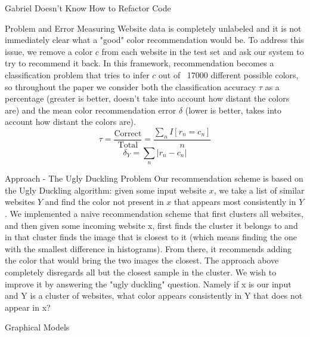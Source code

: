 \documentclass[7pt]{beamer}
\newcommand{\N}{\mathcal{N}}
\begin{document}
\begin{frame}{\centerline{\Huge Gabriel Doesn't Know How to Refactor Code}}
\begin{textblock}{5}
\begin{block}{Problem and Error Measuring}
Website data is completely unlabeled and it is not immediately clear what a "good" color recommendation would be. To address this issue, we remove a color $c$ from each website in the test set and ask our system to try to recommend it back. In this framework, recommendation becomes a classification problem that tries to infer $c$ out of ~17000 different possible colors, so throughout the paper we consider both the classification accuracy $\tau$ as a percentage (greater is better, doesn't take into account how distant the colors are) and the mean color recommendation error $\delta$ (lower is better, takes into account how distant the colors are).
$$\tau = \frac{\text{Correct}}{\text{Total}} = \frac{\sum_n I[r_n = c_n]}{n}$$
$$\delta_Y = \sum_n |r_n - c_n|$$
\end{block}


\begin{block}{Approach - The Ugly Duckling Problem}
Our recommendation scheme is based on the Ugly Duckling algorithm: given some input website $x$, we take a list of similar websites $Y$ and find the color not present in $x$ that appears most consistently in $Y$.
We implemented a naive recommendation scheme that first clusters all websites, and then
given some incoming website x, first finds the cluster it belongs to and in that cluster finds the
image that is closest to it (which means finding the one with the smallest difference in
histograms). From there, it recommends adding the color that would bring the two images the
closest.
The approach above completely disregards all but the closest sample in the cluster. We wish to
improve it by answering the "ugly duckling" question. Namely if x is our input and Y is a cluster
of websites, what color appears consistently in Y that does not appear in x?
\end{block}

\begin{block}{Graphical Models}
\begin{figure}
\centering
{}
\end{figure}
\end{block}



\end{textblock}
\end{frame}
\end{document}
